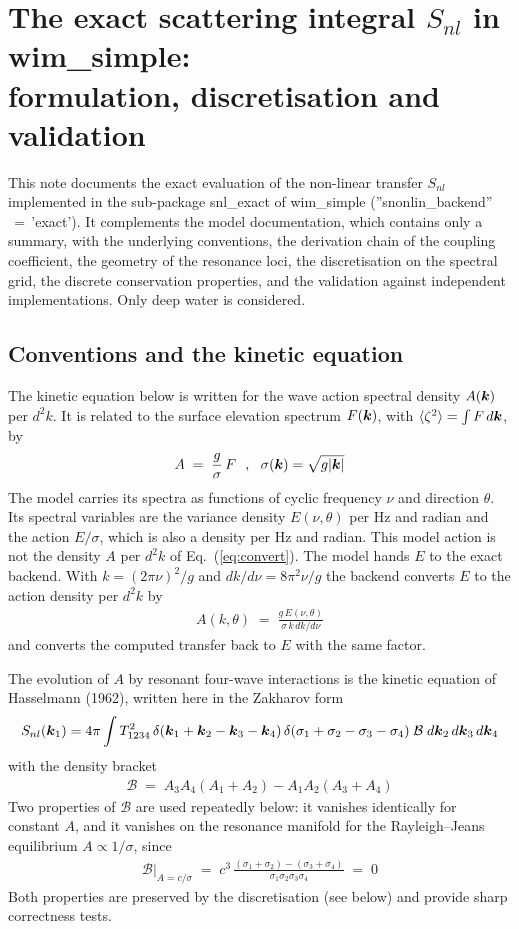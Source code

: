 \documentclass[12pt]{article}
\newcommand{\beq}  { \begin{eqnarray} }
\newcommand{\eeq}  { \end{eqnarray}}
\newcommand{\eq }  [1]{Eq.~(\ref{#1})}  %
\renewcommand{\v}[1]{{\mbox{\boldmath$ #1 $}}}  %
\begin{document}
\section*{The exact scattering integral $S_{nl}$ in wim\_simple: \\ formulation, discretisation and validation}

This note documents the exact evaluation of the non-linear transfer $S_{nl}$
implemented in the sub-package snl\_exact of wim\_simple
(''snonlin\_backend''$\,=\,$'exact').
It complements the model documentation, which contains only a summary,
with the underlying conventions, the derivation chain of the coupling
coefficient, the geometry of the resonance loci, the discretisation on the
spectral grid, the discrete conservation properties, and the validation
against independent implementations.
Only deep water is considered.

\subsection*{Conventions and the kinetic equation}

The kinetic equation below is written for the wave action spectral density
$A(\v k)$ per $d^2 k$. It is related to the surface elevation spectrum
$F(\v k)$, with $\langle \zeta^2 \rangle = \int F \, d\v k$, by
\beq \label{eq:convert}
 A \;=\; \frac{g}{\sigma}\, F   ~~,~~ \sigma(\v k) = \sqrt{g |\v k|}
\eeq
The model carries its spectra as functions of cyclic frequency $\nu$ and
direction $\theta$. Its spectral variables are the variance density
$E(\nu,\theta)$ per Hz and radian and the action $E/\sigma$, which is also a
density per Hz and radian. This model action is not the density $A$ per
$d^2 k$ of \eq{eq:convert}. The model hands $E$ to the exact backend.
With $k = (2\pi\nu)^2/g$ and $dk/d\nu = 8\pi^2 \nu / g$ the backend converts
$E$ to the action density per $d^2 k$ by
\beq
 A(k,\theta) \;=\; \frac{g \, E(\nu,\theta)}{\sigma \, k \, dk/d\nu}
\eeq
and converts the computed transfer back to $E$ with the same factor.

The evolution of $A$ by resonant four-wave interactions is the kinetic
equation of Hasselmann (1962), written here in the Zakharov form
\beq \label{eq:kinetic}
 S_{nl}(\v k_1) = 4\pi \int T^2_{1234}\,
 \delta(\v k_1 + \v k_2 - \v k_3 - \v k_4)\,
 \delta(\sigma_1 + \sigma_2 - \sigma_3 - \sigma_4)\; \mathcal{B}\;
 d\v k_2 \, d\v k_3 \, d\v k_4
\eeq
with the density bracket
\beq \label{eq:bracket}
 \mathcal{B} \;=\; A_3 A_4 (A_1 + A_2) - A_1 A_2 (A_3 + A_4)
\eeq
Two properties of $\mathcal{B}$ are used repeatedly below: it vanishes
identically for constant $A$, and it vanishes on the resonance manifold for
the Rayleigh--Jeans equilibrium $A \propto 1/\sigma$, since
\beq \label{eq:rj}
 \mathcal{B}\big|_{A = c/\sigma} \;=\;
 c^3\, \frac{(\sigma_1+\sigma_2) - (\sigma_3+\sigma_4)}
           {\sigma_1 \sigma_2 \sigma_3 \sigma_4} \;=\; 0
\eeq
Both properties are preserved by the discretisation (see below) and provide
sharp correctness tests.
\end{document}
